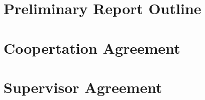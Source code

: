 \documentclass[11pt]{article}
\begin{document}
\section{Preliminary Report Outline}
\label{sec:out}



\section{Coopertation Agreement}
\label{sec:coop}


\section{Supervisor Agreement}
\label{sec:super}


\label{sec:lof}
\listoffigures
\end{document}
